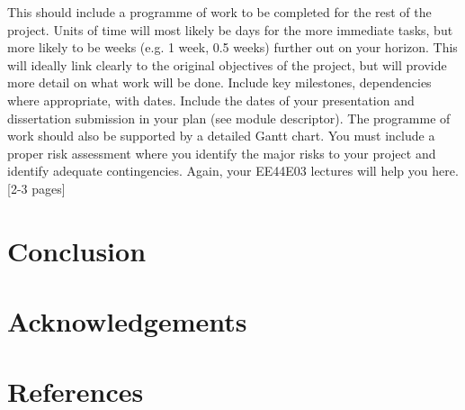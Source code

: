 \documentclass[12pt]{extarticle}
\begin{document}
This should include a programme of work to be completed for the rest of the project. Units of time will most likely be days for the more immediate tasks, but more likely to be weeks (e.g. 1 week, 0.5 weeks) further out on your horizon. This will ideally link clearly to the original objectives of the project, but will provide more detail on what work will be done. Include key milestones, dependencies where appropriate, with dates. Include the dates of your presentation and dissertation submission in your plan (see module descriptor). The programme of work should also be supported by a detailed Gantt chart. You must include a proper risk assessment where you identify the major risks to your project and identify adequate contingencies. Again, your EE44E03 lectures will help you here. [2-3 pages] 

\section{Conclusion}

\section{Acknowledgements}

\section{References}
\end{document}
